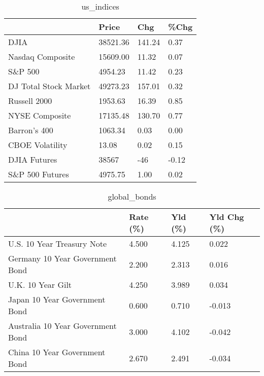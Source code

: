 \documentclass{article}%
\begin{document}
%


\begin{table}[htbp]%
\caption{us\_indices}%
\centering%
\begin{adjustbox}{width=1\textwidth}%
\begin{tabular}{llll}
\toprule
                      &    Price &    Chg &  \%Chg \\
\midrule
                 DJIA & 38521.36 & 141.24 &  0.37 \\
     Nasdaq Composite & 15609.00 &  11.32 &  0.07 \\
              S\&P 500 &  4954.23 &  11.42 &  0.23 \\
DJ Total Stock Market & 49273.23 & 157.01 &  0.32 \\
         Russell 2000 &  1953.63 &  16.39 &  0.85 \\
       NYSE Composite & 17135.48 & 130.70 &  0.77 \\
         Barron's 400 &  1063.34 &   0.03 &  0.00 \\
      CBOE Volatility &    13.08 &   0.02 &  0.15 \\
         DJIA Futures &    38567 &    -46 & -0.12 \\
      S\&P 500 Futures &  4975.75 &   1.00 &  0.02 \\
\bottomrule
\end{tabular}
%
\end{adjustbox}%
\end{table}

%


\begin{table}[htbp]%
\caption{global\_bonds}%
\centering%
\begin{adjustbox}{width=1\textwidth}%
\begin{tabular}{llll}
\toprule
                                  & Rate (\%) & Yld (\%) & Yld Chg (\%) \\
\midrule
       U.S. 10 Year Treasury Note &    4.500 &   4.125 &       0.022 \\
  Germany 10 Year Government Bond &    2.200 &   2.313 &       0.016 \\
                U.K. 10 Year Gilt &    4.250 &   3.989 &       0.034 \\
    Japan 10 Year Government Bond &    0.600 &   0.710 &      -0.013 \\
Australia 10 Year Government Bond &    3.000 &   4.102 &      -0.042 \\
    China 10 Year Government Bond &    2.670 &   2.491 &      -0.034 \\
\bottomrule
\end{tabular}
%
\end{adjustbox}%
\end{table}
\end{document}
